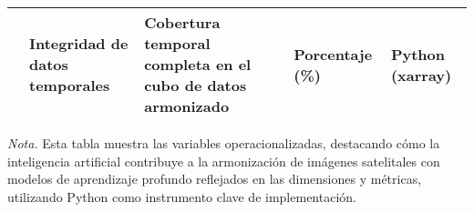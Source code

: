 \begin{table}[H]
\begin{spacing}{8}
\begin{tabularx}{\linewidth}{P{2.5cm}P{2.6cm}P{4cm}P{2.5cm}P{2.5cm}}
                    \addlinespace
                    & Integridad de datos temporales & Cobertura temporal completa en el cubo de datos armonizado & Porcentaje (\%) & Python (xarray) \\
                    \bottomrule
                \end{tabularx}
            \end{spacing}
            \vspace{1\baselineskip}
            \textit{Nota.} Esta tabla muestra las variables operacionalizadas, destacando cómo la inteligencia artificial contribuye a la armonización de imágenes satelitales con modelos de aprendizaje profundo reflejados en las dimensiones y métricas, utilizando Python como instrumento clave de implementación.
            \label{UsoLandsat2}
        \end{table}


